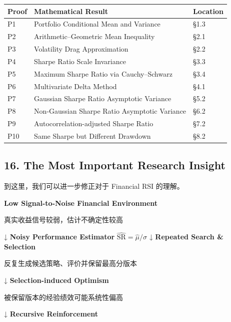 \begin{readertable}
\begin{longtable}[]{@{}
  >{\raggedright\arraybackslash}p{}
  >{\raggedright\arraybackslash}p{}
  >{\raggedright\arraybackslash}p{}@{}}
\toprule
Proof & Mathematical Result & Location \\
\midrule
\endhead
P1 & Portfolio Conditional Mean and Variance & §1.3 \\
P2 & Arithmetic--Geometric Mean Inequality & §2.1 \\
P3 & Volatility Drag Approximation & §2.2 \\
P4 & Sharpe Ratio Scale Invariance & §3.3 \\
P5 & Maximum Sharpe Ratio via Cauchy--Schwarz & §3.4 \\
P6 & Multivariate Delta Method & §4.1 \\
P7 & Gaussian Sharpe Ratio Asymptotic Variance & §5.2 \\
P8 & Non-Gaussian Sharpe Ratio Asymptotic Variance & §6.2 \\
P9 & Autocorrelation-adjusted Sharpe Ratio & §7.2 \\
P10 & Same Sharpe but Different Drawdown & §8.2 \\
\bottomrule
\end{longtable}
\end{readertable}

\hypertarget{part-4-67-0001-the-most-important-research-insight}{%
\subsection{16. The Most Important Research Insight}\label{part-4-67-0001-the-most-important-research-insight}}

到这里，我们可以进一步修正对于 Financial RSI 的理解。

\textbf{Low Signal-to-Noise Financial Environment}

真实收益信号较弱，估计不确定性较高

↓ \textbf{Noisy Performance Estimator} \(\widehat{\mathrm{SR}}=\hat\mu/\hat\sigma\) ↓ \textbf{Repeated Search \& Selection}

反复生成候选策略、评价并保留最高分版本

↓ \textbf{Selection-induced Optimism}

被保留版本的经验绩效可能系统性偏高

↓ \textbf{Recursive Reinforcement}


